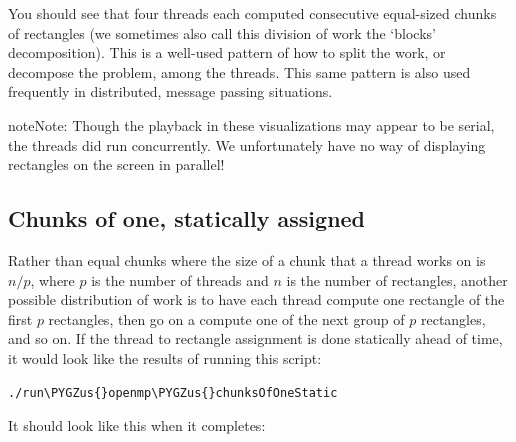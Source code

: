 \documentclass[letterpaper,10pt,openany,oneside]{sphinxmanual}
\def\PYGZus{\char`\_}
\begin{document}
You should see that four threads each computed consecutive equal-sized chunks of rectangles (we sometimes also call this division of work the `blocks' decomposition).  This is a well-used pattern of how to split the work, or decompose the problem, among the threads.  This same pattern is also used frequently in distributed, message passing situations.

\begin{notice}{note}{Note:}
Though the playback in these visualizations may appear to be serial, the threads did run concurrently. We unfortunately have no way of displaying rectangles on the screen in parallel!
\end{notice}


\subsection{Chunks of one, statically assigned}
\label{ParallelVis:chunks-of-one-statically-assigned}
Rather than equal chunks where the size of a chunk that a thread works on is $n/p$, where $p$ is the number of threads and $n$ is the number of rectangles, another possible distribution of work is to have each thread compute one rectangle of the first $p$ rectangles, then go on a compute one of the next group of $p$ rectangles, and so on. If the thread to rectangle assignment is done statically ahead of time, it would look like the results of running this script:

\begin{Verbatim}[commandchars=\\\{\}]
./run\PYGZus{}openmp\PYGZus{}chunksOfOneStatic
\end{Verbatim}

It should look like this when it completes:
\end{document}
